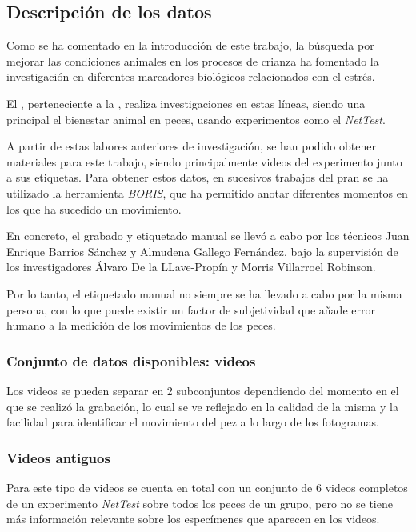 \subsection{Descripción de los datos}

Como se ha comentado en la introducción de este trabajo, la búsqueda por mejorar las condiciones animales en los procesos de crianza ha fomentado la investigación en 
diferentes marcadores biológicos relacionados con el estrés.

El \cite{ObservatorioUPM}, perteneciente a la , realiza investigaciones en estas líneas, siendo una principal el bienestar animal en peces, 
usando experimentos como el \textit{NetTest}.

A partir de estas labores anteriores de investigación, se han podido obtener materiales para este trabajo, siendo principalmente videos del experimento junto a sus etiquetas. Para obtener 
estos datos, en sucesivos trabajos del \acrshort{pran} se ha utilizado la herramienta \textit{BORIS}\cite{friardBORISFreeVersatile2016}, que ha permitido anotar diferentes momentos en los que 
ha sucedido un movimiento.

En concreto, el grabado y etiquetado manual se llevó a cabo por los técnicos Juan Enrique Barrios Sánchez\cite{barriossanchezPruebaRedEvaluando2023}  y Almudena Gallego Fernández, bajo la supervisión de los investigadores 
Álvaro De la LLave-Propín y Morris Villarroel Robinson.

Por lo tanto, el etiquetado manual no siempre se ha llevado a cabo por la misma persona, con lo que puede existir un factor de subjetividad que añade error humano a la medición de los 
movimientos de los peces.

\subsubsection{Conjunto de datos disponibles: videos}

Los videos se pueden separar en 2 subconjuntos dependiendo del momento en el que se realizó la grabación, lo cual se ve reflejado en la calidad de la misma y la facilidad para identificar el movimiento 
del pez a lo largo de los fotogramas.

\subsubsection*{Videos antiguos}

Para este tipo de videos se cuenta en total con un conjunto de 6 videos completos de un experimento \textit{NetTest} sobre todos los peces de un grupo, pero no se tiene más información relevante sobre 
los especímenes que aparecen en los videos.

